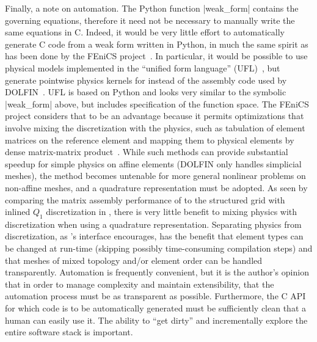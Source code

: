 Finally, a note on automation.
The Python function \pyverb|weak_form| contains the governing equations, therefore it need not be necessary to manually write the same equations in C.
Indeed, it would be very little effort to automatically generate C code from a weak form written in Python, in much the same spirit as has been done by the FEniCS project~\citep{fenicsproject}.
In particular, it would be possible to use physical models implemented in the ``unified form language'' (UFL)~\citep{alnaes2009unified}, but generate pointwise physics kernels for {\Dohp} instead of the assembly code used by DOLFIN~\citep{logg2010dolfin}.
UFL is based on Python and looks very similar to the symbolic \pyverb|weak_form| above, but includes specification of the function space.
The FEniCS project considers that to be an advantage because it permits optimizations that involve mixing the discretization with the physics, such as tabulation of element matrices on the reference element and mapping them to physical elements by dense matrix-matrix product~\citep{kirby2005optimizing}.
While such methods can provide substantial speedup for simple physics on affine elements (DOLFIN only handles simplicial meshes), the method becomes untenable for more general nonlinear problems on non-affine meshes, and a quadrature representation must be adopted.
As seen by comparing the matrix assembly performance of {\Dohp} to the structured grid with inlined $Q_1$ discretization in , there is very little benefit to mixing physics with discretization when using a quadrature representation.
Separating physics from discretization, as \Dohp's interface encourages, has the benefit that element types can be changed at run-time (skipping possibly time-consuming compilation steps) and that meshes of mixed topology and/or element order can be handled transparently.
Automation is frequently convenient, but it is the author's opinion that in order to manage complexity and maintain extensibility, that the automation process must be as transparent as possible.
Furthermore, the C API for which code is to be automatically generated must be sufficiently clean that a human can easily use it.
The ability to ``get dirty'' and incrementally explore the entire software stack is important.
